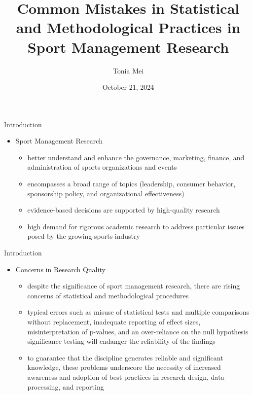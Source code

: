\documentclass[aspectratio=169, 12pt]{beamer}
\title{Common Mistakes in Statistical and Methodological Practices in Sport Management Research}
\author{Tonia Mei}
\date{October 21, 2024}
\begin{document}
\frame{\titlepage}


\begin{frame}{Introduction}
  \begin{itemize}
    \item Sport Management Research
    \begin{itemize}
        \item better understand and enhance the governance, marketing, finance, and administration of sports organizations and events
        \item encompasses a broad range of topics (leadership, consumer behavior, sponsorship policy, and organizational effectiveness)
        \item evidence-based decisions are supported by high-quality research
        \item high demand for rigorous academic research to address particular issues posed by the growing sports industry
    \end{itemize}
  \end{itemize}
\end{frame}


\begin{frame}{Introduction}
  \begin{itemize}
    \item Concerns in Research Quality
    \begin{itemize}
        \item despite the significance of sport management research, there are rising concerns of statistical and methodological procedures
        \item typical errors such as misuse of statistical tests and multiple comparisons without replacement, inadequate reporting of effect sizes, misinterpretation of p-values, and an over-reliance on the null hypothesis significance testing will endanger the reliability of the findings
        \item to guarantee that the discipline generates reliable and significant knowledge, these problems underscore the necessity of increased awareness and adoption of best practices in research design, data processing, and reporting
    \end{itemize}
  \end{itemize}
\end{frame}
\end{document}
